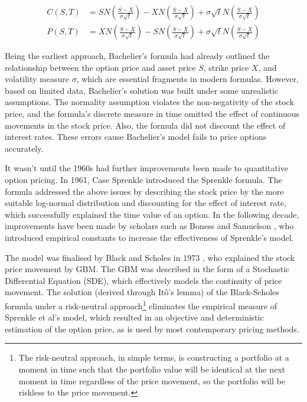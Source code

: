 \begin{align*}
C(S, T) &= SN(\frac{S - X}{\sigma\sqrt{t}}) - XN(\frac{S - X}{\sigma \sqrt{t}}) + \sigma\sqrt{t}N(\frac{S - X}{\sigma \sqrt{t}}) \\
P(S, T) &= XN(\frac{S - X}{\sigma \sqrt{t}}) - SN(\frac{S - X}{\sigma \sqrt{t}}) + \sigma\sqrt{t}N(\frac{S - X}{\sigma \sqrt{t}})
\end{align*}

Being the earliest approach, Bachelier's formula had already outlined the relationship between the option price and asset price $S$, strike price $X$, and volatility measure $\sigma$, which are essential fragments in modern formulas. However, based on limited data, Bachelier's solution was built under some unrealistic assumptions. The normality assumption violates the non-negativity of the stock price, and the formula's discrete measure in time omitted the effect of continuous movements in the stock price. Also, the formula did not discount the effect of interest rates. These errors cause Bachelier's model fails to price options accurately.

It wasn't until the 1960s had further improvements been made to quantitative option pricing. In 1961, Case Sprenkle \cite{Sprenkle1961} introduced the Sprenkle formula. The formula addressed the above issues by describing the stock price by the more suitable log-normal distribution and discounting for the effect of interest rate, which successfully explained the time value of an option. In the following decade, improvements have been made by scholars such as Boness and Samuelson \cite{BS1973}, who introduced empirical constants to increase the effectiveness of Sprenkle's model.

The model was finalised by Black and Scholes in 1973 \cite{BS1973}, who explained the stock price movement by GBM. The GBM was described in the form of a Stochastic Differential Equation (SDE), which effectively models the continuity of price movement. The solution (derived through Itô's lemma) of the Black-Scholes formula under a risk-neutral approach\footnote{The risk-neutral approach, in simple terms, is constructing a portfolio at a moment in time such that the portfolio value will be identical at the next moment in time regardless of the price movement, so the portfolio will be riskless to the price movement.} eliminates the empirical measure of Sprenkle et al's model, which resulted in an objective and deterministic estimation of the option price, as is used by most contemporary pricing methods.

